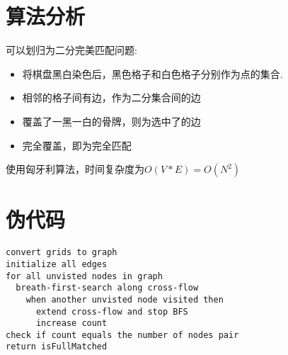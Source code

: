 \documentclass[a4paper]{article}
\begin{document}
\section{算法分析}
可以划归为二分完美匹配问题: 
\begin{itemize}
	\item 将棋盘黑白染色后，黑色格子和白色格子分别作为点的集合. 
	\item 相邻的格子间有边，作为二分集合间的边
	\item 覆盖了一黑一白的骨牌，则为选中了的边
	\item 完全覆盖，即为完全匹配
\end{itemize}	
使用匈牙利算法，时间复杂度为$O(V*E) = O(N^2)$
\section{伪代码}
\begin{verbatim}
convert grids to graph
initialize all edges
for all unvisted nodes in graph
  breath-first-search along cross-flow
    when another unvisted node visited then
      extend cross-flow and stop BFS
      increase count 
check if count equals the number of nodes pair
return isFullMatched
\end{verbatim}
\end{document}
